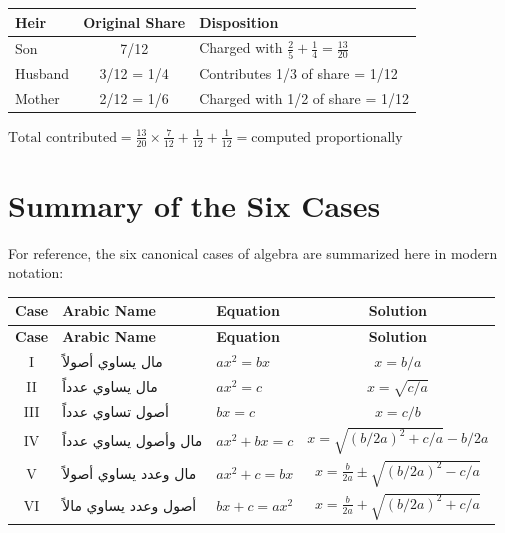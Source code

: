 \documentclass[11pt,a4paper,openany,oneside]{book}
\newcommand{\ar}[1]{{\arabicfont\beginR #1\endR}}
\begin{document}
\begin{mathbox}
\begin{center}
\begin{tabular}{l|c|l}
\textbf{Heir} & \textbf{Original Share} & \textbf{Disposition} \\
\hline
Son & 7/12 & Charged with $\frac{2}{5} + \frac{1}{4} = \frac{13}{20}$ \\
Husband & 3/12 = 1/4 & Contributes 1/3 of share = 1/12 \\
Mother & 2/12 = 1/6 & Charged with 1/2 of share = 1/12 \\
\end{tabular}
\end{center}

$\text{Total contributed} = \frac{13}{20} \times \frac{7}{12} + \frac{1}{12} + \frac{1}{12} = \text{computed proportionally}$
\end{mathbox}

\newpage

\appendix

\chapter{Summary of the Six Cases}
\label{app:six-cases}

For reference, the six canonical cases of algebra are summarized here in
modern notation:

\begin{center}
\renewcommand{\arraystretch}{1.6}
\begin{longtable}{|c|l|l|c|}
\hline
\textbf{Case} & \textbf{Arabic Name} & \textbf{Equation} & \textbf{Solution} \\
\hline
\endfirsthead
\hline
\textbf{Case} & \textbf{Arabic Name} & \textbf{Equation} & \textbf{Solution} \\
\hline
\endhead
\hline
\endfoot
I & \ar{مال يساوي أصولاً} & $ax^2 = bx$ & $x = b/a$ \\
\hline
II & \ar{مال يساوي عدداً} & $ax^2 = c$ & $x = \sqrt{c/a}$ \\
\hline
III & \ar{أصول تساوي عدداً} & $bx = c$ & $x = c/b$ \\
\hline
IV & \ar{مال وأصول يساوي عدداً} & $ax^2 + bx = c$ & $x = \sqrt{(b/2a)^2 + c/a} - b/2a$ \\
\hline
V & \ar{مال وعدد يساوي أصولاً} & $ax^2 + c = bx$ & $x = \frac{b}{2a} \pm \sqrt{(b/2a)^2 - c/a}$ \\
\hline
VI & \ar{أصول وعدد يساوي مالاً} & $bx + c = ax^2$ & $x = \frac{b}{2a} + \sqrt{(b/2a)^2 + c/a}$ \\
\hline
\end{longtable}
\end{center}
\end{document}
